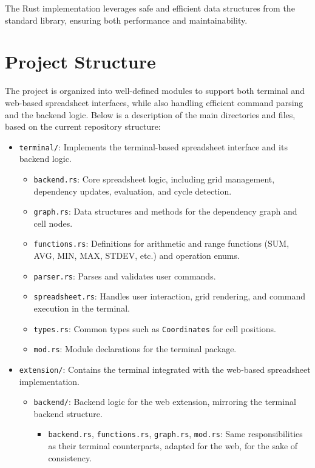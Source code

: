 \documentclass{article}
\begin{document}
\noindent
The Rust implementation leverages safe and efficient data structures from the standard library, ensuring both performance and maintainability.

\section{Project Structure}

The project is organized into well-defined modules to support both terminal and web-based spreadsheet interfaces, while also handling efficient command parsing and the backend logic. Below is a description of the main directories and files, based on the current repository structure:

\begin{itemize}
    \item \texttt{terminal/}: Implements the terminal-based spreadsheet interface and its backend logic.
    \begin{itemize}
        \item \texttt{backend.rs}: Core spreadsheet logic, including grid management, dependency updates, evaluation, and cycle detection.
        \item \texttt{graph.rs}: Data structures and methods for the dependency graph and cell nodes.
        \item \texttt{functions.rs}: Definitions for arithmetic and range functions (SUM, AVG, MIN, MAX, STDEV, etc.) and operation enums.
        \item \texttt{parser.rs}: Parses and validates user commands.
        \item \texttt{spreadsheet.rs}: Handles user interaction, grid rendering, and command execution in the terminal.
        \item \texttt{types.rs}: Common types such as \texttt{Coordinates} for cell positions.
        \item \texttt{mod.rs}: Module declarations for the terminal package.
    \end{itemize}
    \item \texttt{extension/}: Contains the terminal integrated with the web-based spreadsheet implementation.
    \begin{itemize}
        \item \texttt{backend/}: Backend logic for the web extension, mirroring the terminal backend structure.
        \begin{itemize}
            \item \texttt{backend.rs}, \texttt{functions.rs}, \texttt{graph.rs}, \texttt{mod.rs}: Same responsibilities as their terminal counterparts, adapted for the web, for the sake of consistency.

\end{itemize}
\end{itemize}
\end{itemize}
\end{document}
